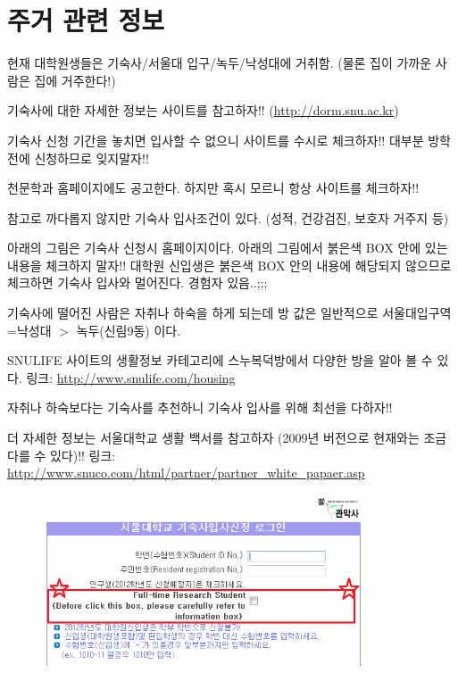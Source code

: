 \section{주거 관련 정보}
\begin{packed_item}
\item 현재 대학원생들은 기숙사/서울대 입구/녹두/낙성대에 거취함. (물론 집이 가까운 사람은 집에 거주한다!)
\item 기숙사에 대한 자세한 정보는 사이트를 참고하자!! (\url{http://dorm.snu.ac.kr})
\item 기숙사 신청 기간을 놓치면 입사할 수 없으니  사이트를 수시로 체크하자!! 대부분 방학 전에 신청하므로 잊지말자!!
\item 천문학과 홈페이지에도 공고한다. 하지만 혹시 모르니 항상 사이트를 체크하자!!
\item 참고로 까다롭지 않지만 기숙사 입사조건이 있다. (성적, 건강검진, 보호자 거주지 등)
\item 아래의 그림은 기숙사 신청시 홈페이지이다. 아래의 그림에서 붉은색 BOX 안에 있는 내용을 체크하지 말자!! 대학원 신입생은 붉은색 BOX 안의 내용에 해당되지 않으므로 체크하면 기숙사 입사와 멀어진다. 경험자 있음..;;;
\item 기숙사에 떨어진 사람은 자취나 하숙을 하게 되는데 방 값은 일반적으로 서울대입구역=낙성대 $>$ 녹두(신림9동) 이다.
\item SNULIFE 사이트의 생활정보 카테고리에 스누복덕방에서 다양한 방을 알아 볼 수 있다. 링크: \url{http://www.snulife.com/housing}
\item 자취나 하숙보다는 기숙사를 추천하니 기숙사 입사를 위해 최선을 다하자!!
\item 더 자세한 정보는 서울대학교 생활 백서를 참고하자 (2009년 버전으로 현재와는 조금 다를 수 있다)!! 링크: \url{http://www.snuco.com/html/partner/partner_white_papaer.asp}
\end{packed_item}

\begin{figure}
\begin{center}
\includegraphics[width=0.85\textwidth]{./Figures/dorm.png}
\end{center}
\end{figure}


